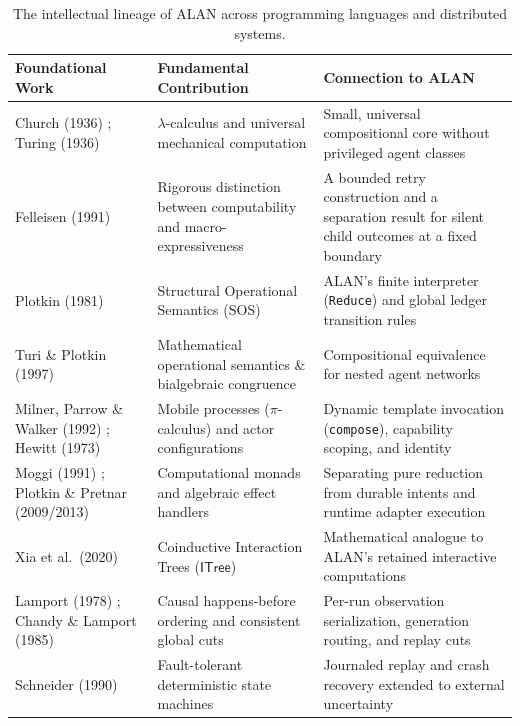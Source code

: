 \documentclass[11pt,a4paper]{article}
\theoremstyle{definition}
\theoremstyle{remark}
\newcommand{\ITree}{\mathsf{ITree}}
\begin{document}
\begin{table}[ht]
\centering
\small
\begin{tabular}{@{}>{\raggedright\arraybackslash}p{}>{\raggedright\arraybackslash}p{}>{\raggedright\arraybackslash}p{}@{}}
\toprule
\textbf{Foundational Work} & \textbf{Fundamental Contribution} & \textbf{Connection to ALAN} \\
\midrule
Church (1936) \cite{church1936unsolvable}; Turing (1936) \cite{turing1936computable} & $\lambda$-calculus and universal mechanical computation & Small, universal compositional core without privileged agent classes \\
Felleisen (1991) \cite{felleisen1991expressive} & Rigorous distinction between computability and macro-expressiveness & A bounded retry construction and a separation result for silent child outcomes at a fixed boundary \\
Plotkin (1981) \cite{plotkin1981structural} & Structural Operational Semantics (SOS) & ALAN's finite interpreter (\texttt{Reduce}) and global ledger transition rules \\
Turi \& Plotkin (1997) \cite{turi1997towards} & Mathematical operational semantics \& bialgebraic congruence & Compositional equivalence for nested agent networks \\
Milner, Parrow \& Walker (1992) \cite{milner1992calculus}; Hewitt (1973) \cite{hewitt1973universal} & Mobile processes ($\pi$-calculus) and actor configurations & Dynamic template invocation (\texttt{compose}), capability scoping, and identity \\
Moggi (1991) \cite{moggi1991notions}; Plotkin \& Pretnar (2009/2013) \cite{plotkin2013handling} & Computational monads and algebraic effect handlers & Separating pure reduction from durable intents and runtime adapter execution \\
Xia et al.\ (2020) \cite{xia2020interaction} & Coinductive Interaction Trees ($\ITree$) & Mathematical analogue to ALAN's retained interactive computations \\
Lamport (1978) \cite{lamport1978time}; Chandy \& Lamport (1985) \cite{chandy1985distributed} & Causal happens-before ordering and consistent global cuts & Per-run observation serialization, generation routing, and replay cuts \\
Schneider (1990) \cite{schneider1990implementing} & Fault-tolerant deterministic state machines & Journaled replay and crash recovery extended to external uncertainty \\
\bottomrule
\end{tabular}
\caption{The intellectual lineage of ALAN across programming languages and distributed systems.}
\label{tab:lineage}
\end{table}
\end{document}
